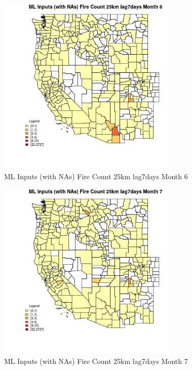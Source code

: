 \begin{figure} 
\centering  
\includegraphics[width=0.77\textwidth]{Code_Outputs/Report_ML_input_PM25_Step4_part_f_de_duplicated_aveswNAs_CountyFire_Count_25km_lag7daysmedianMonth6.jpg} 
\caption{\label{fig:Report_ML_input_PM25_Step4_part_f_de_duplicated_aveswNAsCountyFire_Count_25km_lag7daysmedianMonth6}ML Inputs (with NAs) Fire Count 25km lag7days Month 6} 
\end{figure} 
 

\begin{figure} 
\centering  
\includegraphics[width=0.77\textwidth]{Code_Outputs/Report_ML_input_PM25_Step4_part_f_de_duplicated_aveswNAs_CountyFire_Count_25km_lag7daysmedianMonth7.jpg} 
\caption{\label{fig:Report_ML_input_PM25_Step4_part_f_de_duplicated_aveswNAsCountyFire_Count_25km_lag7daysmedianMonth7}ML Inputs (with NAs) Fire Count 25km lag7days Month 7} 
\end{figure} 
 

